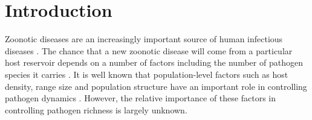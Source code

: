 

\section{Introduction}











Zoonotic diseases are an increasingly important source of human infectious diseases \cite{jones2008global, woolhouse2006host, taylor2001risk}.
The chance that a new zoonotic disease will come from a particular host reservoir depends on a number of factors including the number of pathogen species it carries \cite{wolfe2000deforestation}.
It is well known that population-level factors such as host density, range size and population structure have an important role in controlling pathogen dynamics \cite{anderson1979population, may1979population, colizza2007invasion, may2001infection}.
However, the relative importance of these factors in controlling pathogen richness is largely unknown.


